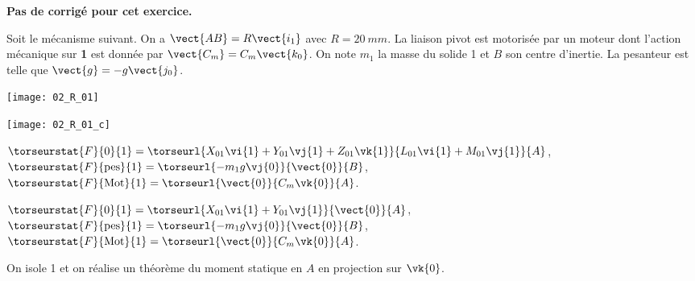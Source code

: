 \normaltrue
\correctiontrue


\setcounter{numques}{0}
\ifcorrection
\else
\textbf{Pas de corrigé pour cet exercice.}
\fi

\ifprof
\else
Soit le mécanisme suivant. On a $\vect{AB}=R\vect{i_1}$ avec $R=\SI{20}{mm}$. La liaison pivot est motorisée par un moteur dont l'action mécanique sur \textbf{1} est donnée par $\vect{C_m}=C_m \vect{k_0}$.
On note $m_1$ la masse du solide 1 et $B$ son centre d'inertie. 
 La pesanteur est telle que $\vect{g}=-g\vect{j_0}$.

\begin{center}
\texttt{[image: 02\_R\_01]}
\end{center}
\fi

\ifprof
\begin{center}
\texttt{[image: 02\_R\_01\_c]}
\end{center}
\else
\fi

\ifprof
$\torseurstat{F}{0}{1}=\torseurl{X_{01}\vi{1}+Y_{01}\vj{1}+Z_{01}\vk{1}}{L_{01}\vi{1}+M_{01}\vj{1}}{A}$,
$\torseurstat{F}{\text{pes}}{1}=\torseurl{-m_1g\vj{0}}{\vect{0}}{B}$, 
$\torseurstat{F}{\text{Mot}}{1}=\torseurl{\vect{0}}{C_m\vk{0}}{A}$.
\else
\fi


\ifprof
$\torseurstat{F}{0}{1}=\torseurl{X_{01}\vi{1}+Y_{01}\vj{1}}{\vect{0}}{A}$,
$\torseurstat{F}{\text{pes}}{1}=\torseurl{-m_1g\vj{0}}{\vect{0}}{B}$,
$\torseurstat{F}{\text{Mot}}{1}=\torseurl{\vect{0}}{C_m\vk{0}}{A}$.
\else
\fi

\ifprof
On isole 1 et on réalise un théorème du moment statique en $A$ en projection sur $\vk{0}$.
\else
\fi



